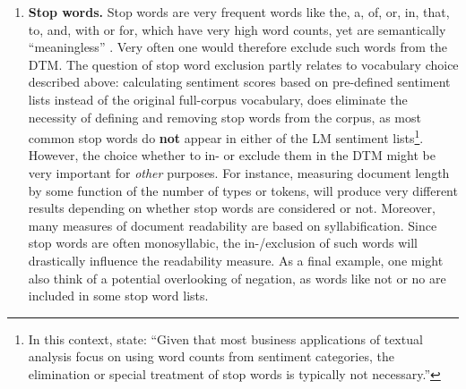 \begin{enumerate}[(1)]
\item \textbf{Stop words.} Stop words are very frequent words like \textsf{the, a, of, or, in, that, to, and, with} or \textsf{for}, which have very high word counts, yet are semantically \enquote{meaningless} \parencite{Gries_2009, Jurafsky_Draft_2017}. Very often one would therefore exclude such words from the DTM. The question of stop word exclusion partly relates to vocabulary choice described above: calculating sentiment scores based on pre-defined sentiment lists instead of the original full-corpus vocabulary, does eliminate the necessity of defining and removing stop words from the corpus, as most common stop words do \textbf{not} appear in either of the LM sentiment lists\footnote{In this context, \textcite[1206]{LM-meta-2016} state: \enquote{Given that most business applications of textual analysis focus on using word counts from sentiment categories, the elimination or special treatment of stop words is typically not necessary.}}. However, the choice whether to in- or exclude them in the DTM might be very important for \textit{other} purposes. For instance, measuring document length by some function of the number of types or tokens, will produce very different results depending on whether stop words are considered or not. Moreover, many measures of document readability are based on syllabification. Since stop words are often monosyllabic, the in-/exclusion of such words will drastically influence the readability measure. As a final example, one might also think of a potential overlooking of negation, as words like \textsf{not} or \textsf{no} are included in some stop word lists.


\end{enumerate}
